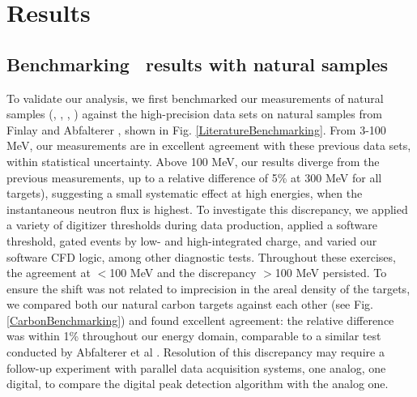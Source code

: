 \section{Results}
\subsection{Benchmarking \tot\ results with natural samples}
To validate our analysis, we first benchmarked our \totEs measurements of natural samples
(\cNat, \niNat, \snNat, \pbNat) against the high-precision data sets on natural samples from Finlay
\cite{Finlay1993} and Abfalterer \cite{Abfalterer2001}, shown in Fig.
\ref{LiteratureBenchmarking}. From 3-100 MeV, our measurements are in excellent agreement with 
these previous data sets, within statistical uncertainty. Above 100 MeV, our results diverge
from the previous measurements, up to a relative difference of 5\% at 300 MeV for all targets), 
suggesting a small 
systematic effect at high energies, when the instantaneous neutron flux is highest. To investigate
this discrepancy, we applied a variety of digitizer thresholds during data production, applied a 
software threshold, gated events by low- and high-integrated charge, and varied our software CFD 
logic, among other diagnostic tests. Throughout these exercises, the agreement at $<$100 MeV and the 
discrepancy $>$100 MeV persisted. To ensure the shift was not related to imprecision in the areal
density of the targets, we compared both our natural carbon targets against each other (see Fig.
\ref{CarbonBenchmarking}) and found excellent agreement: the relative difference
was within 1\% throughout our energy domain, comparable to a similar test conducted by Abfalterer et
al \cite{Abfalterer2001}. Resolution of this discrepancy may require a follow-up experiment with 
parallel data acquisition systems, one analog, one digital, to compare the digital peak detection
algorithm with the analog one.

